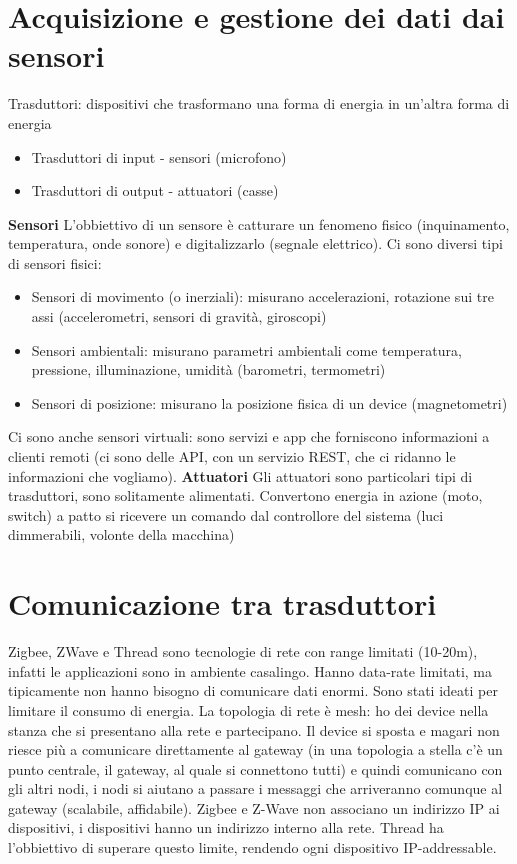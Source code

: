 \documentclass[12pt,italian]{report}
\begin{document}
\section{Acquisizione e gestione dei dati dai sensori}
Trasduttori: dispositivi che trasformano una forma di energia in un'altra forma di energia
\begin{itemize}
    \item Trasduttori di input - sensori (microfono)
    \item Trasduttori di output - attuatori (casse)
\end{itemize}
\bigbreak
\noindent \textbf{Sensori}
L'obbiettivo di un sensore è catturare un fenomeno fisico (inquinamento, temperatura, onde sonore) e digitalizzarlo (segnale elettrico). 
\bigbreak
Ci sono diversi tipi di sensori fisici:
\begin{itemize}
    \item Sensori di movimento (o inerziali): misurano accelerazioni, rotazione sui tre assi (accelerometri, sensori di gravità, giroscopi)
    \item Sensori ambientali: misurano parametri ambientali come temperatura, pressione, illuminazione, umidità (barometri, termometri)
    \item Sensori di posizione: misurano la posizione fisica di un device (magnetometri) 
\end{itemize}
Ci sono anche sensori virtuali: sono servizi e app che forniscono informazioni a clienti remoti (ci sono delle API, con un servizio REST, che ci ridanno le informazioni che vogliamo). 
\bigbreak
\noindent \textbf{Attuatori}
Gli attuatori sono particolari tipi di trasduttori, sono solitamente alimentati. Convertono energia in azione (moto, switch) a patto si ricevere un comando dal controllore del sistema (luci dimmerabili, volonte della macchina) 
\section{Comunicazione tra trasduttori}
Zigbee, ZWave e Thread sono tecnologie di rete con range limitati (10-20m), infatti le applicazioni sono in ambiente casalingo. Hanno data-rate limitati, ma tipicamente non hanno bisogno di comunicare dati enormi. Sono stati ideati per limitare il consumo di energia. La topologia di rete è mesh: ho dei device nella stanza che si presentano alla rete e partecipano. Il device si sposta e magari non riesce più a comunicare direttamente al gateway (in una topologia a stella c'è un punto centrale, il gateway, al quale si connettono tutti) e quindi comunicano con gli altri nodi, i nodi si aiutano a passare i messaggi che arriveranno comunque al gateway (scalabile, affidabile). Zigbee e Z-Wave non associano un indirizzo IP ai dispositivi, i dispositivi hanno un indirizzo interno alla rete. Thread ha l'obbiettivo di superare questo limite, rendendo ogni dispositivo IP-addressable. 
\end{document}
